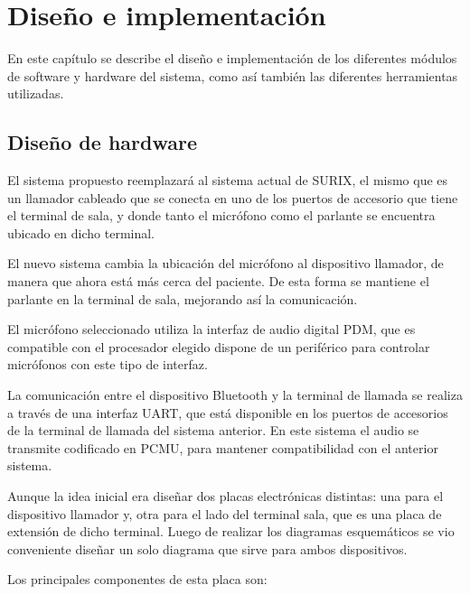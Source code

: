 	\chapter{Diseño e implementación} %

\label{Chapter3}

En este capítulo se describe el diseño e implementación de los diferentes módulos de software y hardware del sistema, como así también las diferentes herramientas utilizadas.




\section{Diseño de hardware}

El sistema propuesto reemplazará al sistema actual de SURIX, el mismo que es un llamador cableado que se conecta en uno de los puertos de accesorio que tiene el terminal de sala, y donde tanto el micrófono como el parlante se encuentra ubicado en dicho terminal.

El nuevo sistema cambia la ubicación del micrófono al dispositivo llamador, de manera que ahora está más cerca del paciente. De esta forma se mantiene el parlante en la terminal de sala, mejorando así la comunicación.

El micrófono seleccionado utiliza la interfaz de audio digital PDM, que es compatible con el procesador elegido dispone de un periférico para controlar micrófonos con este tipo de interfaz.

La comunicación entre el dispositivo Bluetooth y la terminal de llamada se realiza a  través de una interfaz UART, que está disponible en los puertos de accesorios de la terminal de llamada del sistema anterior.
En este sistema el audio se transmite codificado en PCMU, para mantener compatibilidad con el anterior sistema.

Aunque la idea inicial era diseñar dos placas electrónicas distintas: una para el dispositivo llamador y, otra para el lado del terminal sala, que es una placa de extensión de dicho terminal. Luego de realizar los diagramas esquemáticos se vio conveniente diseñar un solo diagrama que sirve para ambos dispositivos. 

Los principales componentes de esta placa son:

